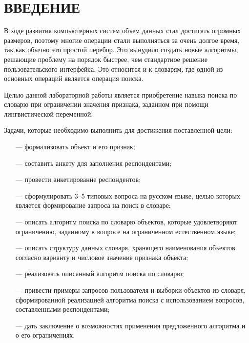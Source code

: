 \section*{ВВЕДЕНИЕ}

В ходе развития компьютерных систем объем данных стал достигать огромных размеров, поэтому многие операции стали выполняться за очень долгое время, так как обычно это простой перебор. Это вынудило создать новые алгоритмы, решающие проблему на порядок быстрее, чем стандартное решение пользовательского интерфейса. Это относится и к словарям, где одной из основных операций является операция поиска.

Целью данной лабораторной работы является приобретение навыка поиска по словарю при ограничении значения признака, заданном при
помощи лингвистической переменной.

Задачи, которые необходимо выполнить для достижения поставленной цели:
\begin{itemize}
	\item[---] формализовать объект и его признак;
	\item[---] составить анкету для заполнения респондентами;
	\item[---] провести анкетирование респондентов;
	\item[---] сформулировать 3–5 типовых вопроса на русском языке, целью которых является формирование запроса на поиск в словаре;
	\item[---] описать алгоритм поиска по словарю объектов, которые удовлетворяют ограничению, заданному в вопросе на ограниченном естественном языке;
	\item[---] описать структуру данных словаря, хранящего наименования объектов согласно варианту и числовое значение признака объекта;
	\item[---] реализовать описанный алгоритм поиска по словарю;
	\item[---] привести примеры запросов пользователя и выборки объектов из словаря, сформированной реализацией алгоритма поиска с использованием вопросов, составленными респондентами;
	\item[---] дать заключение о возможностях применения предложенного алгоритма и о его ограничениях.
\end{itemize}